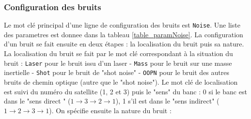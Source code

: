 \documentclass[a4paper,english,12pt]{article}
\begin{document}
\subsubsection{Configuration des bruits}
\label{SSSConfigGW}
Le mot cl\'e principal d'une ligne de configuration des bruits est \texttt{Noise}. Une liste des parametres est donnee dans la tableau \ref{table_paramNoise}. La configuration d'un bruit se fait ensuite en deux \'etapes : la localisation du bruit puis sa nature. La localisation du bruit se fait par le mot cl\'e correspondant \`a la situation du bruit : \texttt{Laser} pour le bruit issu d'un laser  - \texttt{Mass} pour le bruit sur une masse inertielle - \texttt{Shot} pour le bruit de "shot noise" - \texttt{OOPN} pour le bruit des autres bruits de chemin optique (autre que le "shot noise"). Le mot cl\'e de localisation est suivi du num\'ero du satellite (1, 2 et 3) puis le "sens" du banc : 0 si le banc est dans le "sens direct " ($1\rightarrow 3\rightarrow 2\rightarrow 1$), 1 s'il est dans le "sens indirect" ($1\rightarrow 2\rightarrow 3\rightarrow 1$). On sp\'ecifie ensuite la nature du bruit : \\
\end{document}
